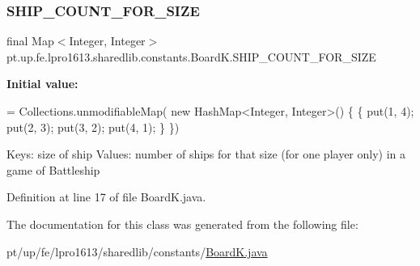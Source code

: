 \subsubsection{\texorpdfstring{S\+H\+I\+P\+\_\+\+C\+O\+U\+N\+T\+\_\+\+F\+O\+R\+\_\+\+S\+I\+ZE}{SHIP\_COUNT\_FOR\_SIZE}}
{\footnotesize\ttfamily final Map$<$Integer, Integer$>$ pt.\+up.\+fe.\+lpro1613.\+sharedlib.\+constants.\+Board\+K.\+S\+H\+I\+P\+\_\+\+C\+O\+U\+N\+T\+\_\+\+F\+O\+R\+\_\+\+S\+I\+ZE\hspace{0.3cm}{\ttfamily [static]}}

{\bfseries Initial value\+:}
\begin{DoxyCode}
= Collections.unmodifiableMap(
                    \textcolor{keyword}{new} HashMap<Integer, Integer>() \{
                \{
                    put(1, 4);
                    put(2, 3);
                    put(3, 2);
                    put(4, 1);
                \}
            \})
\end{DoxyCode}
Keys\+: size of ship Values\+: number of ships for that size (for one player only) in a game of Battleship 

Definition at line 17 of file Board\+K.\+java.



The documentation for this class was generated from the following file\+:\begin{DoxyCompactItemize}
\item 
pt/up/fe/lpro1613/sharedlib/constants/\hyperlink{_board_k_8java}{Board\+K.\+java}\end{DoxyCompactItemize}
